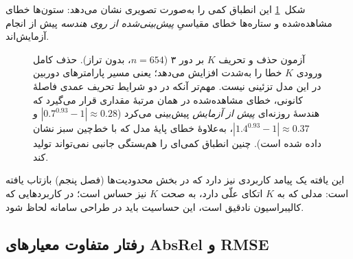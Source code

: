 شکل~\ref{fig:k_knockout} این انطباق کمی را به‌صورت تصویری نشان می‌دهد:
ستون‌ها خطای مشاهده‌شده و ستاره‌ها خطای مقیاسیِ \emph{پیش‌بینی‌شده از روی
هندسه} پیش از انجام آزمایش‌اند.

\begin{figure}[htbp]
    \centering
    \caption[آزمون حذف و تحریف $K$ در برابر پیش‌بینی هندسی]{آزمون حذف و
    تحریف $K$ بر \proposedmodel{} دور ۳ ($n=654$، بدون تراز). حذف کامل ورودی
    $K$ خطا را به‌شدت افزایش می‌دهد؛ یعنی مسیر پارامترهای دوربین در این مدل
    تزئینی نیست. مهم‌تر آنکه در دو شرایط تحریف عمدی فاصلهٔ کانونی، خطای
    مشاهده‌شده در همان مرتبهٔ مقداری قرار می‌گیرد که هندسهٔ روزنه‌ای
    \emph{پیش از آزمایش} پیش‌بینی می‌کرد ($|0.7^{0.93}-1|\approx 0.28$ و
    $|1.4^{0.93}-1|\approx 0.37$، به‌علاوهٔ خطای پایهٔ مدل که با خط‌چین سبز
    نشان داده شده است). چنین انطباق کمی‌ای را هم‌بستگی جانبی نمی‌تواند
    تولید کند.}
    \label{fig:k_knockout}
\end{figure}

این یافته یک پیامد کاربردی نیز دارد که در بخش محدودیت‌ها (فصل پنجم) بازتاب یافته است: مدلی که به $K$ اتکای علّی دارد، به صحت $K$ نیز حساس است؛ در کاربردهایی که کالیبراسیون نادقیق است، این حساسیت باید در طراحی سامانه لحاظ شود.

\subsection{رفتار متفاوت معیارهای AbsRel و RMSE}
\label{subsec:metric_behavior}

